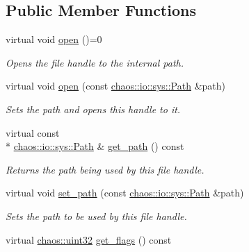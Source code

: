 \subsection*{Public Member Functions}
\begin{DoxyCompactItemize}
\item 
virtual void \hyperlink{classchaos_1_1io_1_1sys_1_1_file_handle_aaab721e850f11cd1f1bf3dba8e4ab2a1}{open} ()=0
\begin{DoxyCompactList}\small\item\em Opens the file handle to the internal path. \end{DoxyCompactList}\item 
virtual void \hyperlink{classchaos_1_1io_1_1sys_1_1_file_handle_ac38cdc6e3d48bba2d6e143265c7aaaad}{open} (const \hyperlink{classchaos_1_1io_1_1sys_1_1_path}{chaos\-::io\-::sys\-::\-Path} \&path)
\begin{DoxyCompactList}\small\item\em Sets the path and opens this handle to it. \end{DoxyCompactList}\item 
\hypertarget{classchaos_1_1io_1_1sys_1_1_file_handle_aeb0c8615f3b16ceb7f9130b1482b3b42}{virtual const \\*
\hyperlink{classchaos_1_1io_1_1sys_1_1_path}{chaos\-::io\-::sys\-::\-Path} \& \hyperlink{classchaos_1_1io_1_1sys_1_1_file_handle_aeb0c8615f3b16ceb7f9130b1482b3b42}{get\-\_\-path} () const }\label{classchaos_1_1io_1_1sys_1_1_file_handle_aeb0c8615f3b16ceb7f9130b1482b3b42}

\begin{DoxyCompactList}\small\item\em Returns the path being used by this file handle. \end{DoxyCompactList}\item 
virtual void \hyperlink{classchaos_1_1io_1_1sys_1_1_file_handle_a14272fcf341c329bf15f7198b5e08573}{set\-\_\-path} (const \hyperlink{classchaos_1_1io_1_1sys_1_1_path}{chaos\-::io\-::sys\-::\-Path} \&path)
\begin{DoxyCompactList}\small\item\em Sets the path to be used by this file handle. \end{DoxyCompactList}\item 
\hypertarget{classchaos_1_1io_1_1sys_1_1_file_handle_a5cfd6d2ef58b86bf4a8b729a0825f508}{virtual \hyperlink{namespacechaos_a8641b3ae4551f0b35570d4f9f4ec22d9}{chaos\-::uint32} \hyperlink{classchaos_1_1io_1_1sys_1_1_file_handle_a5cfd6d2ef58b86bf4a8b729a0825f508}{get\-\_\-flags} () const }\label{classchaos_1_1io_1_1sys_1_1_file_handle_a5cfd6d2ef58b86bf4a8b729a0825f508}


\end{DoxyCompactItemize}

